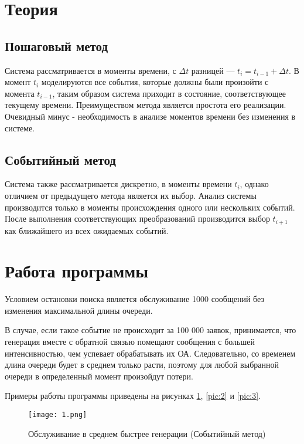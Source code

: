 \section{Теория}
	\subsection{Пошаговый метод}
	Система рассматривается в моменты времени, с $\Delta t$ разницей ---  $t_{i} = t_{i-1} + \Delta t$. В момент $t_i$ моделируются все события, которые должны были произойти с момента $t_{i-1}$, таким образом система приходит в состояние, соответствующее текущему времени. Преимуществом метода является простота его реализации. Очевидный минус - необходимость в анализе моментов времени без изменения в системе.
	
	\subsection{Событийный метод}
	Система также рассматривается дискретно, в моменты времени $t_i$, однако отличием от предыдущего метода является их выбор. Анализ системы производится только в моменты происхождения одного или нескольких событий. После выполнения соответствующих преобразований производится выбор $t_{i+1}$ как ближайшего из всех ожидаемых событий.

\section{Работа программы}
	Условием остановки поиска является обслуживание 1000 сообщений без изменения максимальной длины очереди.   
	
	В случае, если такое событие не происходит за 100 000 заявок, принимается, что генерация вместе с обратной связью помещают сообщения с большей интенсивностью, чем успевает обрабатывать их ОА. Следовательно, со временем длина очереди будет в среднем только расти, поэтому для любой выбранной очереди в определенный момент произойдут потери.
	
	Примеры работы программы приведены на рисунках \ref{pic:1}, \ref{pic:2} и \ref{pic:3}.
	
	\begin{figure}[h]
		\begin{center}
			{\texttt{[image: 1.png]}
			\caption{Обслуживание в среднем быстрее генерации (Событийный метод)}
			\label{pic:1}}
		\end{center}
	\end{figure}

